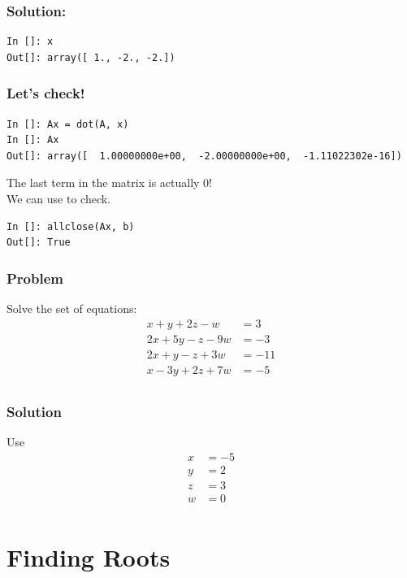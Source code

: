 \documentclass[14pt,compress]{beamer}
\newcounter{time}
\newcommand{\inctime}[1]{\addtocounter{time}{#1}{\tiny \thetime\ m}}
\newcommand{\kwrd}[1]{ \texttt{\textbf{\color{blue}{#1}}}  }
\begin{document}
\begin{frame}[fragile]
\frametitle{Solution:}
\begin{lstlisting}
In []: x
Out[]: array([ 1., -2., -2.])
\end{lstlisting}
\end{frame}

\begin{frame}[fragile]
\frametitle{Let's check!}
\begin{small}
\begin{lstlisting}
In []: Ax = dot(A, x)
In []: Ax
Out[]: array([  1.00000000e+00,  -2.00000000e+00,  -1.11022302e-16])
\end{lstlisting}
\end{small}
\begin{block}{}
The last term in the matrix is actually \alert{0}!\\
We can use \kwrd{allclose()} to check.
\end{block}
\begin{lstlisting}
In []: allclose(Ax, b)
Out[]: True
\end{lstlisting}
\inctime{10}
\end{frame}

\begin{frame}[fragile]
\frametitle{Problem}
Solve the set of equations:
\begin{align*}
  x + y + 2z -w & = 3\\
  2x + 5y - z - 9w & = -3\\
  2x + y -z + 3w & = -11 \\
  x - 3y + 2z + 7w & = -5\\
\end{align*}
\inctime{5}
\end{frame}

\begin{frame}[fragile]
\frametitle{Solution}
Use \kwrd{solve()}
\begin{align*}
  x & = -5\\
  y & = 2\\
  z & = 3\\
  w & = 0\\
\end{align*}
\end{frame}

\section{Finding Roots}
\end{document}
